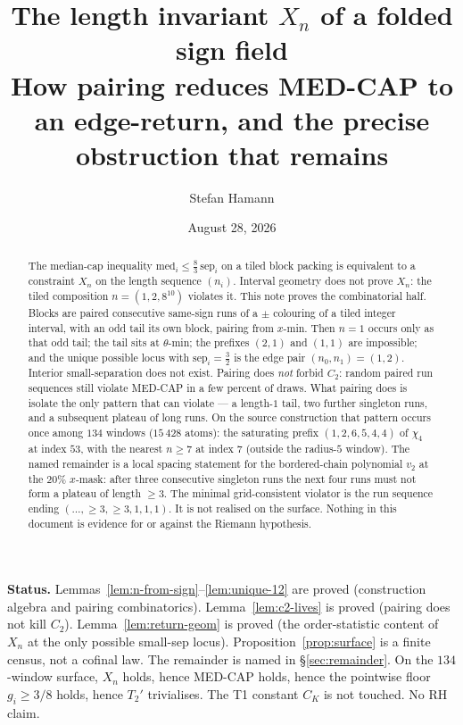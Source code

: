\documentclass[11pt]{article}
\title{\bfseries The length invariant $X_n$ of a folded sign field\\[2mm]
\large How pairing reduces MED-CAP to an edge-return,
and the precise obstruction that remains}
\author{Stefan Hamann}
\date{August 28, 2026}
\theoremstyle{remark}
\begin{document}
\maketitle

\begin{abstract}\noindent
The median-cap inequality $\mathrm{med}_i\le\tfrac83\,\mathrm{sep}_i$
on a tiled block packing is equivalent to a constraint $X_n$ on the
length sequence $(n_i)$.  Interval geometry does not prove $X_n$: the
tiled composition $n=(1,2,8^{10})$ violates it.  This note proves the
combinatorial half.  Blocks are paired consecutive same-sign runs of a
$\pm$ colouring of a tiled integer interval, with an odd tail its own
block, pairing from $x$-min.  Then $n=1$ occurs only as that odd tail;
the tail sits at $\theta$-min; the prefixes $(2,1)$ and $(1,1)$ are
impossible; and the unique possible locus with $\mathrm{sep}_i=\tfrac32$
is the edge pair $(n_0,n_1)=(1,2)$.  Interior small-separation does not
exist.  Pairing does \emph{not} forbid $C_2$: random paired run sequences
still violate MED-CAP in a few percent of draws.  What pairing does is
isolate the only pattern that can violate --- a length-$1$ tail, two
further singleton runs, and a subsequent plateau of long runs.
On the source construction that pattern occurs once among $134$ windows
($15\,428$ atoms): the saturating prefix $(1,2,6,5,4,4)$ of $\chi_4$ at
index $53$, with the nearest $n\ge 7$ at index $7$ (outside the
radius-$5$ window).  The named remainder is a local spacing statement
for the bordered-chain polynomial $v_2$ at the $20\%$ $x$-mask: after
three consecutive singleton runs the next four runs must not form a
plateau of length $\ge 3$.  The minimal grid-consistent violator is the
run sequence ending $(\ldots,{\ge}3,{\ge}3,1,1,1)$.  It is not realised
on the surface.  Nothing in this document is evidence for or against
the Riemann hypothesis.
\end{abstract}

\medskip\noindent
\textbf{Status.}\enspace
Lemmas~\ref{lem:n-from-sign}--\ref{lem:unique-12} are proved
(construction algebra and pairing combinatorics).
Lemma~\ref{lem:c2-lives} is proved (pairing does not kill $C_2$).
Lemma~\ref{lem:return-geom} is proved (the order-statistic content of
$X_n$ at the only possible small-sep locus).
Proposition~\ref{prop:surface} is a finite census, not a cofinal law.
The remainder is named in \S\ref{sec:remainder}.
On the $134$-window surface, $X_n$ holds, hence MED-CAP holds, hence
the pointwise floor $g_i\ge 3/8$ holds, hence $T_2'$ trivialises.
The T1 constant $C_K$ is not touched.
No RH claim.
\end{document}
